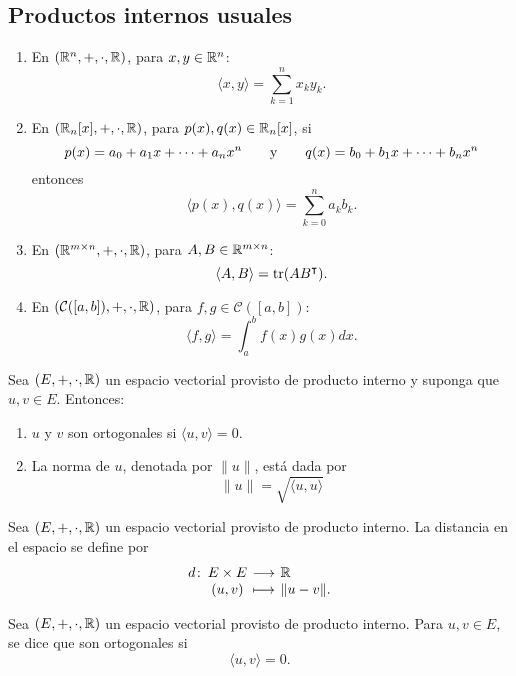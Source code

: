 \documentclass[a4,11pt]{aleph-notas}
\begin{document}
\subsection{Productos internos usuales}

\begin{enumerate}
    \item En $(\R^n,+, \cdot, \R)$, para $x,y\in \R^n$:
    \[
        \langle x, y \rangle = \sum_{k=1}^n x_k y_k.
    \]
    
    \item En $(\R_n[x],+, \cdot, \R)$, para $p(x),q(x)\in \R_n[x]$, si 
    \[  
        p(x) = a_0 + a_1x + \cdots + a_nx^n
        \texty
        q(x) = b_0 + b_1x + \cdots + b_nx^n
    \]
    entonces
    \[
        \langle p(x), q(x) \rangle = \sum_{k=0}^n a_k b_k.
    \]
    
    \item En $(\Mat[\R]{m}{n},+, \cdot, \R)$, para $A,B\in \Mat[\R]{m}{n}$:
    \[
        \langle A, B \rangle = \tr(AB^\intercal).
    \]
    
    \item En $(\mathcal{C}([a,b]),+, \cdot, \R)$, para $f,g\in \mathcal{C}([a,b])$:
    \[
        \langle f, g \rangle = \int_a^b f(x) g(x) dx.
    \]
    \end{enumerate}

\begin{defi}
Sea $(E,+,\cdot,\R)$ un espacio vectorial provisto de producto interno y suponga que $u, v \in E$.
Entonces:
\begin{enumerate}
    \item $u$ y $v$ son ortogonales si $\langle u, v \rangle = 0$.
    \item La norma de $u$, denotada por $\|u \|$, está dada por
    \[
        \| u\| = \sqrt{\langle u, u \rangle}
    \]
\end{enumerate}
\end{defi}

\begin{defi}
    Sea $(E,+,\cdot,\R)$ un espacio vectorial provisto de producto interno. La distancia en el espacio se define por
    \[
        \funcion{d}{E\times E}{\R}{(u,v)}{\| u - v\|.}
    \]
\end{defi}


\begin{teo}
    Sea $(E,+,\cdot,\R)$ un espacio vectorial provisto de producto interno. Para  $u,v\in E$, se dice que son ortogonales si
    \[
        \langle u , v \rangle = 0.
    \]
\end{teo}
\end{document}
